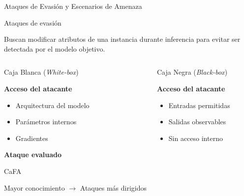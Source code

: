 \documentclass[aspectratio=169, 8pt]{beamer}
\begin{document}
\begin{frame}{Ataques de Evasión y Escenarios de Amenaza}

\begin{alertblock}{Ataques de evasión}

Buscan modificar atributos de una instancia
durante inferencia para evitar ser detectada
por el modelo objetivo.

\end{alertblock}

\vspace{0.15cm}

\begin{columns}


\begin{block}{Caja Blanca (\textit{White-box})}

\textbf{Acceso del atacante}

\begin{itemize}
\item Arquitectura del modelo
\item Parámetros internos
\item Gradientes
\end{itemize}

\vspace{0.1cm}

\textbf{Ataque evaluado}

CaFA

\vspace{0.1cm}

\scriptsize
Mayor conocimiento $\rightarrow$
Ataques más dirigidos

\end{block}




\begin{block}{Caja Negra (\textit{Black-box})}

\textbf{Acceso del atacante}

\begin{itemize}
\item Entradas permitidas
\item Salidas observables
\item Sin acceso interno
\end{itemize}


\end{block}
\end{columns}
\end{frame}
\end{document}
